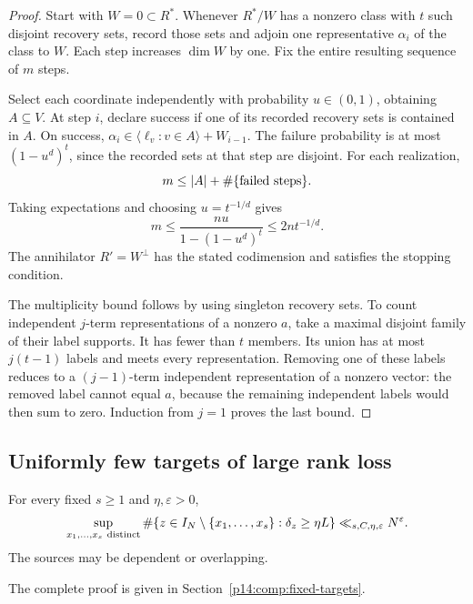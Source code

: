 \begin{proof}
Start with \(W=0\subset R^*\). Whenever \(R^*/W\) has a
nonzero class with \(t\) such disjoint recovery sets, record
those sets and adjoin one representative \(\alpha_i\) of the
class to \(W\). Each step increases \(\dim W\) by one. Fix the
entire resulting sequence of \(m\) steps.

Select each coordinate independently with probability
\(u\in(0,1)\), obtaining \(A\subseteq V\). At step \(i\),
declare success if one of its recorded recovery sets is
contained in \(A\). On success,
\(\alpha_i\in\langle\ell_v:v\in A\rangle+W_{i-1}\).
The failure probability is at most \((1-u^d)^t\), since the
recorded sets at that step are disjoint. For each realization,
\[
 m\le |A|+\#\{\hbox{failed steps}\}.
\]
Taking expectations and choosing \(u=t^{-1/d}\) gives
\[
 m\le \frac{nu}{1-(1-u^d)^t}\le2nt^{-1/d}.
\]
The annihilator \(R'=W^\perp\) has the stated codimension
and satisfies the stopping condition.

The multiplicity bound follows by using singleton recovery sets.
To count independent \(j\)-term representations of a nonzero
\(a\), take a maximal disjoint family of their label supports.
It has fewer than \(t\) members. Its union has at most
\(j(t-1)\) labels and meets every representation. Removing
one of these labels reduces to a \((j-1)\)-term independent
representation of a nonzero vector: the removed label cannot
equal \(a\), because the remaining independent labels would
then sum to zero. Induction from \(j=1\) proves the last bound.
\end{proof}

\subsection{Uniformly few targets of large rank loss}

\begin{proposition}
\label{p1:fixed:targets}
For every fixed \(s\ge1\) and \(\eta,\varepsilon>0\),
\begin{equation}
 \sup_{x_1,\ldots,x_s\ {\rm distinct}}
 \#\{z\in I_N\setminus\{x_1,\ldots,x_s\}:
                   \delta_z\ge\eta L\}
       \ll_{s,C,\eta,\varepsilon}N^\varepsilon .
 \label{p1:fixed:targets-bound}
\end{equation}
The sources may be dependent or overlapping.
\end{proposition}

\noindent The complete proof is given in Section~\ref{p14:comp:fixed-targets}.


